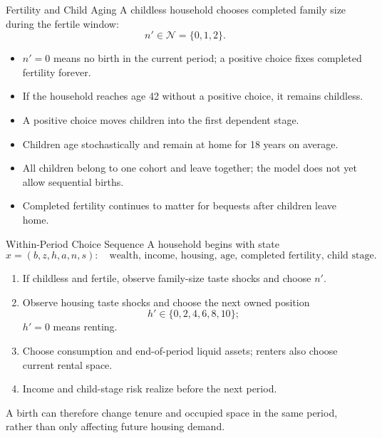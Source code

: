 \documentclass[aspectratio=169,11pt]{beamer}
\newcommand{\tightitems}{\setlength{\itemsep}{0.55em}}
\newcommand{\1}{\mathbf 1}
\begin{document}
\begin{frame}{Fertility and Child Aging}
  A childless household chooses completed family size during the fertile window:
  \[
    n'\in\mathcal N=\{0,1,2\}.
  \]

  \begin{itemize}\tightitems
    \item $n'=0$ means no birth in the current period; a positive choice fixes completed fertility forever.
    \item If the household reaches age 42 without a positive choice, it remains childless.
    \item A positive choice moves children into the first dependent stage.
    \item Children age stochastically and remain at home for 18 years on average.
    \item All children belong to one cohort and leave together; the model does not yet allow sequential births.
    \item Completed fertility continues to matter for bequests after children leave home.
  \end{itemize}
\end{frame}

\begin{frame}{Within-Period Choice Sequence}
  \small
  A household begins with state
  \[
    x=(b,z,h,a,n,s):
    \quad
    \text{wealth, income, housing, age, completed fertility, child stage}.
  \]

  \begin{enumerate}\setlength{\itemsep}{0.35em}
    \item If childless and fertile, observe family-size taste shocks and choose $n'$.
    \item Observe housing taste shocks and choose the next owned position
    \[
      h'\in\{0,2,4,6,8,10\};
    \]
    $h'=0$ means renting.
    \item Choose consumption and end-of-period liquid assets; renters also choose current rental space.
    \item Income and child-stage risk realize before the next period.
  \end{enumerate}

  A birth can therefore change tenure and occupied space in the same period, rather than only affecting future housing demand.
\end{frame}
\end{document}
